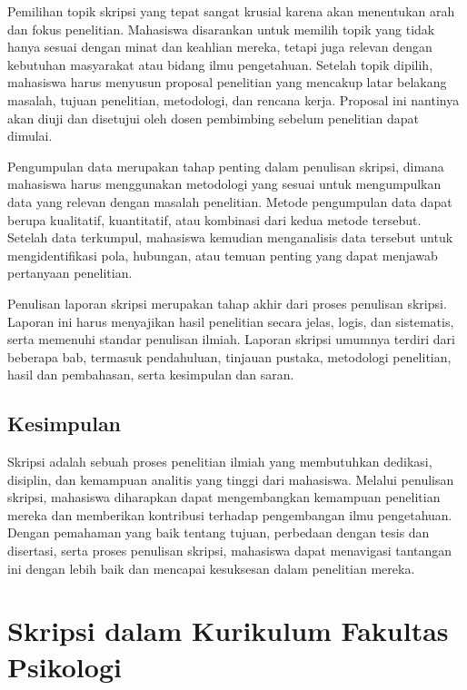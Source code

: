 \documentclass[
  indonesian,
  letterpaper,
]{scrbook}
\begin{document}
Pemilihan topik skripsi yang tepat sangat krusial karena akan menentukan
arah dan fokus penelitian. Mahasiswa disarankan untuk memilih topik yang
tidak hanya sesuai dengan minat dan keahlian mereka, tetapi juga relevan
dengan kebutuhan masyarakat atau bidang ilmu pengetahuan. Setelah topik
dipilih, mahasiswa harus menyusun proposal penelitian yang mencakup
latar belakang masalah, tujuan penelitian, metodologi, dan rencana
kerja. Proposal ini nantinya akan diuji dan disetujui oleh dosen
pembimbing sebelum penelitian dapat dimulai.

Pengumpulan data merupakan tahap penting dalam penulisan skripsi, dimana
mahasiswa harus menggunakan metodologi yang sesuai untuk mengumpulkan
data yang relevan dengan masalah penelitian. Metode pengumpulan data
dapat berupa kualitatif, kuantitatif, atau kombinasi dari kedua metode
tersebut. Setelah data terkumpul, mahasiswa kemudian menganalisis data
tersebut untuk mengidentifikasi pola, hubungan, atau temuan penting yang
dapat menjawab pertanyaan penelitian.

Penulisan laporan skripsi merupakan tahap akhir dari proses penulisan
skripsi. Laporan ini harus menyajikan hasil penelitian secara jelas,
logis, dan sistematis, serta memenuhi standar penulisan ilmiah. Laporan
skripsi umumnya terdiri dari beberapa bab, termasuk pendahuluan,
tinjauan pustaka, metodologi penelitian, hasil dan pembahasan, serta
kesimpulan dan saran.

\section*{Kesimpulan}\label{kesimpulan}


Skripsi adalah sebuah proses penelitian ilmiah yang membutuhkan
dedikasi, disiplin, dan kemampuan analitis yang tinggi dari mahasiswa.
Melalui penulisan skripsi, mahasiswa diharapkan dapat mengembangkan
kemampuan penelitian mereka dan memberikan kontribusi terhadap
pengembangan ilmu pengetahuan. Dengan pemahaman yang baik tentang
tujuan, perbedaan dengan tesis dan disertasi, serta proses penulisan
skripsi, mahasiswa dapat menavigasi tantangan ini dengan lebih baik dan
mencapai kesuksesan dalam penelitian mereka.


\chapter{Skripsi dalam Kurikulum Fakultas
Psikologi}\label{skripsi-dalam-kurikulum-fakultas-psikologi}
\end{document}
